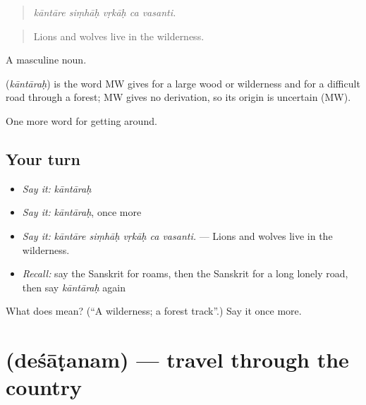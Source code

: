 \begin{quote}
    
\end{quote}

\begin{quote}
\emph{kāntāre siṃhāḥ vṛkāḥ ca vasanti.}
\end{quote}

\begin{quote}
Lions and wolves live in the wilderness.
\end{quote}

A masculine noun.

\begin{cousinweb}
\textbf{} (\emph{kāntāraḥ}) is the word MW gives for a large wood or wilderness and for a difficult road through a forest; MW gives no derivation, so its origin is uncertain (MW).
\end{cousinweb}

\begin{grammarlens}[title={What you've built}]
One more word for getting around.
\end{grammarlens}

\subsection*{Your turn}
\begin{itemize}
\raggedright
  \item \emph{Say it:} \emph{kāntāraḥ}
  \item \emph{Say it:} \emph{kāntāraḥ}, once more
  \item \emph{Say it:} \emph{kāntāre siṃhāḥ vṛkāḥ ca vasanti.} — Lions and wolves live in the wilderness.
  \item \emph{Recall:} say the Sanskrit for roams, then the Sanskrit for a long lonely road, then say \emph{kāntāraḥ} again
\end{itemize}

\begin{tcolorbox}[breakable,colback=teal!4,colframe=teal!35!black,title={Before you move on}]
What does  mean? (\textquotedblleft{}A wilderness; a forest track\textquotedblright{}.) Say it once more.
\end{tcolorbox}
\section[\texorpdfstring{\sk{देशाटनम्} (deśāṭanam)}{देशाटनम् (deśāṭanam)}]{ (deśāṭanam) — travel through the country}

